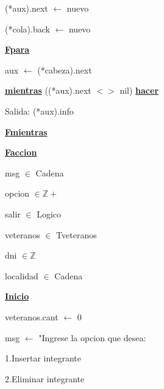 \documentclass{article}
\begin{document}
                    \hspace{20mm}(*aux).next $\leftarrow$ nuevo

                    \hspace{20mm}(*cola).back $\leftarrow$ nuevo

            \hspace{12mm}\underline{\textbf{Fpara}}

            \hspace{12mm}aux $\leftarrow$ (*cabeza).next

            \hspace{12mm}\underline{\textbf{mientras}} ((*aux).next $<>$ nil) \underline{\textbf{hacer}}

                \hspace{16mm}Salida: (*aux).info

            \hspace{12mm}\underline{\textbf{Fmientras}}

    \hspace{4mm}\underline{\textbf{Faccion}}

    \vspace{4mm}

    \hspace{4mm}msg $\in$ Cadena

    \hspace{4mm}opcion $\in \mathbb{Z+}$

    \hspace{4mm}salir $\in$ Logico

    \hspace{4mm}veteranos $\in$ Tveteranos

    \hspace{4mm}dni $\in \mathbb{Z}$

    \hspace{4mm}localidad $\in$ Cadena

    \vspace{4mm}

    \underline{\textbf{Inicio}}

    \hspace{4mm}veteranos.cant $\leftarrow$ 0

    \hspace{4mm}msg $\leftarrow$ "Ingrese la opcion que desea: 

        \hspace{17mm}1.Insertar integrante

        \hspace{17mm}2.Eliminar integrante
\end{document}
